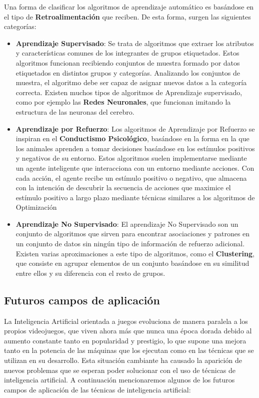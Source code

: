 Una forma de clasificar los algoritmos de aprendizaje automático es basándose en el tipo de \textbf{Retroalimentación} que reciben. De esta forma, surgen las siguientes categorías:
\begin{itemize}
\item \textbf{Aprendizaje Supervisado}: Se trata de algoritmos que extraer los atributos y características comunes de los integrantes de grupos etiquetados. Estos algoritmos funcionan recibiendo conjuntos de muestra formado por datos etiquetados en distintos grupos y categorías. Analizando los conjuntos de muestra, el algoritmo debe ser capaz de asignar nuevos datos a la categoría correcta. Existen muchos tipos de algoritmos de Aprendizaje supervisado, como por ejemplo las \textbf{Redes Neuronales}, que funcionan imitando la estructura de las neuronas del cerebro.
\item \textbf{Aprendizaje por Refuerzo}: Los algoritmos de Aprendizaje por Refuerzo se inspiran en el \textbf{Conductismo Psicológico}, basándose en la forma en la que los animales aprenden a tomar decisiones basándose en los estímulos positivos y negativos de su entorno. Estos algoritmos suelen implementarse mediante un agente inteligente que interacciona con un entorno mediante acciones. Con cada acción, el agente recibe un estímulo positivo o negativo, que almacena con la intención de descubrir la secuencia de acciones que maximice el estímulo positivo a largo plazo mediante técnicas similares a los algoritmos de Optimización
\item \textbf{Aprendizaje No Supervisado}: El aprendizaje No Supervisado son un conjunto de algoritmos que sirven para encontrar asociaciones y patrones en un conjunto de datos sin ningún tipo de información de refuerzo adicional. Existen varias aproximaciones a este tipo de algoritmos, como el \textbf{Clustering}, que consiste en agrupar elementos de un conjunto basándose en su similitud entre ellos y su diferencia con el resto de grupos.
\end{itemize} 

\subsection{Futuros campos de aplicación}
La Inteligencia Artificial orientada a juegos evoluciona de manera paralela a los propios videojuegos, que viven ahora más que nunca una época dorada debido al aumento constante tanto en popularidad y prestigio, lo que supone una mejora tanto en la potencia de las máquinas que los ejecutan como en las técnicas que se utilizan en su desarrollo. Esta situación cambiante ha causado la aparición de nuevos problemas que se esperan poder solucionar con el uso de técnicas de inteligencia artificial.\cite{ai_and_games} A continuación mencionaremos algunos de los futuros campos de aplicación de las técnicas de inteligencia artificial:

